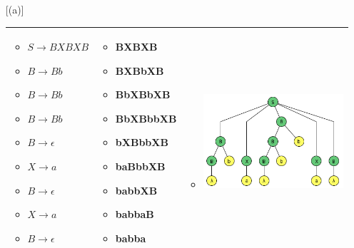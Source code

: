 \documentclass{article}
\begin{document}
\begin{enumerate} [(a)]
\begin{tabular}{|p{3.5cm}|p{3.5cm}|p{8cm}|  }
         \begin{itemize}[label={}]
             \item $ S \to BXBXB$ 
             \item $ B \to Bb$ 
             \item $ B \to Bb$ 
             \item $ B \to Bb$ 
             \item $ B \to \epsilon $ 
             \item $ X \to a$	
             \item $ B \to \epsilon$ 
             \item $ X \to a$	
             \item $ B \to \epsilon$ 
        \end{itemize}
        &
        \begin{itemize}[label={}]
             \item BXBXB 
             \item BXBbXB 
             \item BbXBbXB 
             \item BbXBbbXB 
             \item bXBbbXB 
             \item baBbbXB 
             \item babbXB 
             \item babbaB 
             \item babba 
        \end{itemize}
        
        &
        \begin{itemize}[label={}]
             \item \includegraphics[scale=0.40]{img/2c-babba.png}
        \end{itemize}
      \\ \hline
        \end{tabular}
        \\ \\
        

\end{enumerate}
\end{document}
